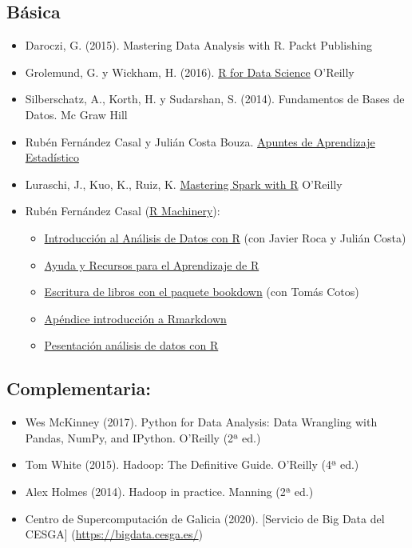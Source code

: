 \documentclass[
]{book}
\providecommand{\tightlist}{%
  \setlength{\itemsep}{0pt}\setlength{\parskip}{0pt}}
\begin{document}
\subsection{Básica}\label{buxe1sica}

\begin{itemize}
\item
  Daroczi, G. (2015). Mastering Data Analysis with R. Packt Publishing
\item
  Grolemund, G. y Wickham, H. (2016). \href{https://r4ds.had.co.nz/}{R for Data Science} O'Reilly
\item
  Silberschatz, A., Korth, H. y Sudarshan, S. (2014). Fundamentos de Bases de Datos. Mc Graw Hill
\item
  Rubén Fernández Casal y Julián Costa Bouza. \href{https://rubenfcasal.github.io/aprendizaje_estadistico/}{Apuntes de Aprendizaje Estadístico}
\item
  Luraschi, J., Kuo, K., Ruiz, K. \href{https://therinspark.com/}{Mastering Spark with R} O'Reilly
\item
  Rubén Fernández Casal (\href{https://rubenfcasal.github.io}{R Machinery}):

  \begin{itemize}
  \item
    \href{https://rubenfcasal.github.io/intror}{Introducción al Análisis de Datos con R}
    (con Javier Roca y Julián Costa)
  \item
    \href{https://rubenfcasal.github.io/post/ayuda-y-recursos-para-el-aprendizaje-de-r}{Ayuda y Recursos para el Aprendizaje de R}
  \item
    \href{https://rubenfcasal.github.io/bookdown_intro}{Escritura de libros con el paquete bookdown}
    (con Tomás Cotos)
  \item
    \href{https://rubenfcasal.github.io/bookdown_intro/rmarkdown.html}{Apéndice introducción a Rmarkdown}
  \item
    \href{https://rubenfcasal.github.io/post/presentaciones/AnalisisDatosR.pdf}{Pesentación análisis de datos con R}
  \end{itemize}
\end{itemize}

\subsection{Complementaria:}\label{complementaria}

\begin{itemize}
\tightlist
\item
  Wes McKinney (2017). Python for Data Analysis: Data Wrangling with Pandas, NumPy, and IPython. O'Reilly (2ª ed.)
\item
  Tom White (2015). Hadoop: The Definitive Guide. O'Reilly (4ª ed.)
\item
  Alex Holmes (2014). Hadoop in practice. Manning (2ª ed.)
\item
  Centro de Supercomputación de Galicia (2020). {[}Servicio de Big Data del CESGA{]} (\url{https://bigdata.cesga.es/})
\end{itemize}
\end{document}
